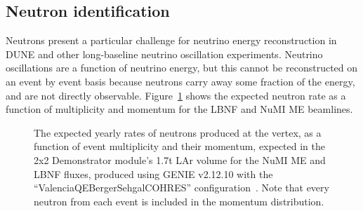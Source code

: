 \subsection{Neutron identification}
\label{sec:2x2_neutron}
Neutrons present a particular challenge for neutrino energy reconstruction in DUNE and other long-baseline neutrino oscillation experiments. Neutrino oscillations are a function of neutrino energy, but this cannot be reconstructed on an event by event basis because neutrons carry away some fraction of the energy, and are not directly observable. Figure~\ref{fig:neutron_kinematics} shows the expected neutron rate as a function of multiplicity and momentum for the LBNF and NuMI ME beamlines.
\begin{figure}[htb]
  \centering
  \caption{The expected yearly rates of neutrons produced at the vertex, as a function of event multiplicity and their momentum, expected in the 2x2 Demonstrator module's 1.7t LAr volume for the NuMI ME and LBNF fluxes, produced using GENIE v2.12.10 with the ``ValenciaQEBergerSehgalCOHRES'' configuration~\cite{genie}. Note that every neutron from each event is included in the momentum distribution.}
  \label{fig:neutron_kinematics}
\end{figure}

